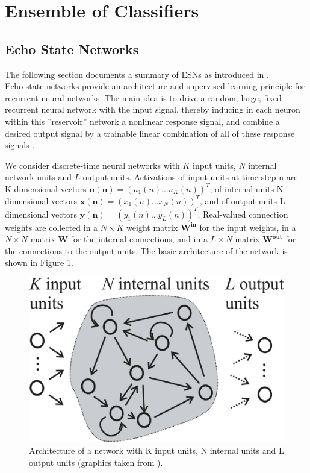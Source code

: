 \documentclass[a4paper,11pt,oneside]{article}
\begin{document}
\section{Ensemble of Classifiers}
\subsection{Echo State Networks}
The following section documents a summary of ESNs as introduced in \cite{spedia,jaeg6,jaeg7}.\\
Echo state networks provide an architecture and supervised learning principle for recurrent neural networks.
The main idea is to drive a random, large, fixed recurrent neural network with the input signal, 
thereby inducing in each neuron within this ”reservoir” network a nonlinear response signal, 
and combine a desired output signal by a trainable linear combination of all of these response signals \cite{spedia}.

We consider discrete-time neural networks with $K$ input units, $N$ internal network units and $L$ output units. 
Activations of input units at time step n are K-dimensional vectors $\mathbf{u(n)} = (u_1(n)...u_K(n))^T$, of internal
units N-dimensional vectors $\mathbf{x(n)} = (x_1(n)...x_N(n))^T$, and of output units L-dimensional vectors 
$\mathbf{y(n)} = (y_1(n)...y_L(n))^T$. Real-valued connection weights are collected in a $N\times K$ weight matrix 
$\mathbf{W^{in}}$ for the input weights, in a $N\times N$ matrix $\mathbf{W}$ for the internal connections, and in a 
$L\times N$ matrix $\mathbf{W^{out}}$ for the connections to the output units. 
The basic architecture of the network is shown in Figure 1.
\begin{figure}[H]
\includegraphics[scale = 0.5]{architecture}
\centering
\caption{Architecture of a network with K input units, N internal units and L output units (graphics 
taken from \cite{jaeg7}).}
\end{figure}
\end{document}
